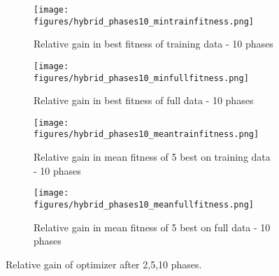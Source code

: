 \begin{figure*}
\begin{subfigure}{0.6\textwidth}
    \end{subfigure}
        \begin{subfigure}{0.6\textwidth}
    \centering
        \texttt{[image: figures/hybrid\_phases10\_mintrainfitness.png]}
        \caption{Relative gain in best fitness of training data - 10 phases}
    \end{subfigure}%
    \begin{subfigure}{0.6\textwidth}
    \centering
        \texttt{[image: figures/hybrid\_phases10\_minfullfitness.png]}
        \caption{Relative gain in best fitness of full data - 10 phases}
    \end{subfigure}
        \begin{subfigure}{0.6\textwidth}
    \centering
        \texttt{[image: figures/hybrid\_phases10\_meantrainfitness.png]}
        \caption{Relative gain in mean fitness of 5 best on training data - 10 phases}
    \end{subfigure}%
    \begin{subfigure}{0.6\textwidth}
    \centering
        \texttt{[image: figures/hybrid\_phases10\_meanfullfitness.png]}
        \caption{Relative gain in mean fitness of 5 best on full data - 10 phases}
            \label{fig:10phase}
    \end{subfigure}

    \caption{Relative gain of optimizer after 2,5,10 phases.}
\end{figure*}
